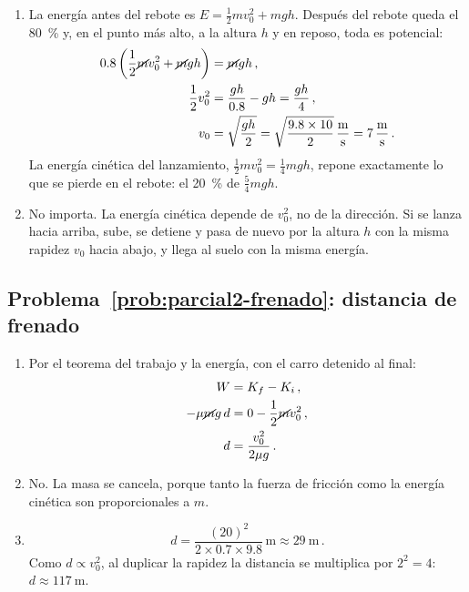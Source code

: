 \documentclass[11pt,a4paper]{book}
\begin{document}
\begin{enumerate}[label=\alph*)]
    \item La energía antes del rebote es
    $E = \tfrac{1}{2}mv_0^2 + mgh$. Después del rebote queda el
    \SI{80}{\percent} y, en el punto más alto, a la altura $h$ y en reposo,
    toda es potencial:
    \begin{align}
        0.8\left(\frac{1}{2}\cancel{m}v_0^2 + \cancel{m}gh\right) &= \cancel{m}gh\,, \nonumber\\
        \frac{1}{2}v_0^2 &= \frac{gh}{0.8} - gh = \frac{gh}{4}\,, \nonumber\\
        v_0 &= \sqrt{\frac{gh}{2}} = \sqrt{\frac{9.8 \times 10}{2}}\,\si{\meter\per\second}
            = \SI{7}{\meter\per\second}\,.
    \end{align}
    La energía cinética del lanzamiento,
    $\tfrac{1}{2}mv_0^2 = \tfrac{1}{4}mgh$, repone exactamente lo que se
    pierde en el rebote: el \SI{20}{\percent} de $\tfrac{5}{4}mgh$.
    \item No importa. La energía cinética depende de $v_0^2$, no de la
    dirección. Si se lanza hacia arriba, sube, se detiene y pasa de nuevo por
    la altura $h$ con la misma rapidez $v_0$ hacia abajo, y llega al suelo con
    la misma energía.
\end{enumerate}

\subsection*{Problema~\ref{prob:parcial2-frenado}: distancia de frenado}
\label{sol:parcial2-frenado}

\begin{enumerate}[label=\alph*)]
    \item Por el teorema del trabajo y la energía, con el carro detenido al
    final:
    \begin{align}
        W &= K_f - K_i\,, \nonumber\\
        -\mu \cancel{m} g\, d &= 0 - \frac{1}{2}\cancel{m}v_0^2\,, \nonumber\\
        d &= \frac{v_0^2}{2\mu g}\,.
    \end{align}
    \item No. La masa se cancela, porque tanto la fuerza de fricción como la
    energía cinética son proporcionales a $m$.
    \item
    \begin{equation}
        d = \frac{(20)^2}{2 \times 0.7 \times 9.8}\,\si{\meter}
          \approx \SI{29}{\meter}\,.
    \end{equation}
    Como $d \propto v_0^2$, al duplicar la rapidez la distancia se
    multiplica por $2^2 = 4$: $d \approx \SI{117}{\meter}$.
\end{enumerate}
\end{document}
